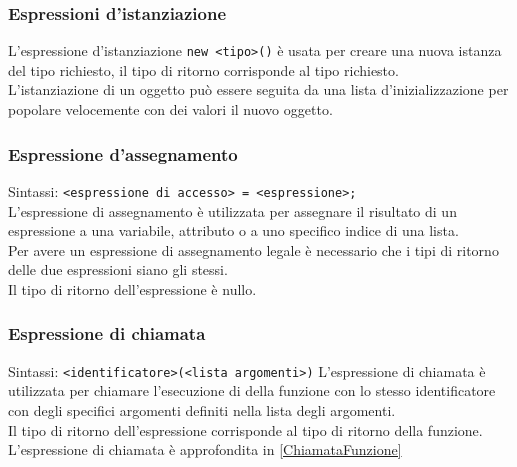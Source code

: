 \subsubsection{Espressioni d'istanziazione}
L'espressione d'istanziazione \verb|new <tipo>()| è usata per creare una nuova istanza del tipo
richiesto, il tipo di ritorno corrisponde al tipo richiesto.
\\
L'istanziazione di un oggetto può essere seguita da una lista d'inizializzazione per popolare 
velocemente con dei valori il nuovo oggetto.

\subsubsection{Espressione d'assegnamento}
Sintassi: \verb|<espressione di accesso> = <espressione>;| \\
L'espressione di assegnamento è utilizzata per assegnare il risultato di un espressione
a una variabile, attributo o a uno specifico indice di una lista. \\
Per avere un espressione di assegnamento legale è necessario che i tipi di ritorno
delle due espressioni siano gli stessi. \\
Il tipo di ritorno dell'espressione è nullo.

\subsubsection{Espressione di chiamata}
Sintassi: \verb|<identificatore>(<lista argomenti>)|
L'espressione di chiamata è utilizzata per chiamare l'esecuzione di della funzione con lo 
stesso identificatore con degli specifici argomenti definiti nella lista degli argomenti. \\
Il tipo di ritorno dell'espressione corrisponde al tipo di ritorno della funzione. \\
L'espressione di chiamata è approfondita in \ref*{ChiamataFunzione}

